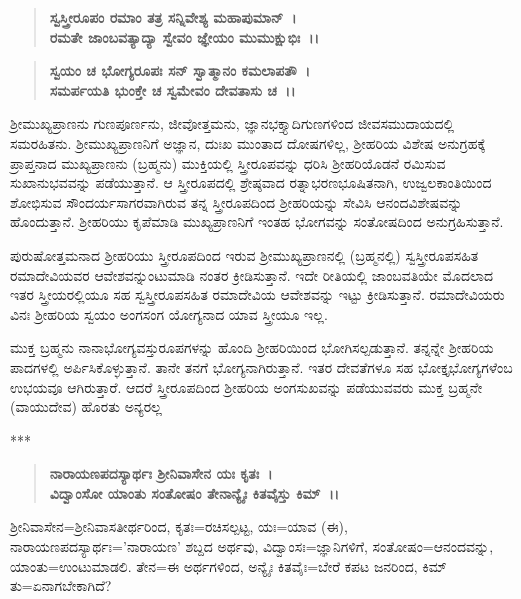 \begin{verse}
\textbf{ಸ್ವಸ್ತ್ರೀರೂಪಂ ರಮಾಂ ತತ್ರ ಸನ್ನಿವೇಶ್ಯ ಮಹಾಪುಮಾನ್~।}\\\textbf{ರಮತೇ ಜಾಂಬವತ್ಯಾದ್ಯಾ ಸ್ವೇವಂ ಜ್ಞೇಯಂ ಮುಮುಕ್ಷುಭಿಃ~।।}
\end{verse}

\begin{verse}
\textbf{ಸ್ವಯಂ ಚ ಭೋಗ್ಯರೂಪಃ ಸನ್ ಸ್ವಾತ್ಮಾನಂ ಕಮಲಾಪತೌ~।}\\\textbf{ಸಮರ್ಪಯತಿ ಭುಂಕ್ತೇ ಚ ಸ್ವಮೇವಂ ದೇವತಾಸು ಚ~।।}
\end{verse}


\vskip 3pt

ಶ‍್ರೀಮುಖ್ಯಪ್ರಾಣನು ಗುಣಪೂರ್ಣನು, ಜೀವೋತ್ತಮನು, ಜ್ಞಾನಭಕ್ತ್ಯಾದಿಗುಣಗಳಿಂದ ಜೀವಸಮುದಾಯದಲ್ಲಿ ಸಮರಹಿತನು. ಶ‍್ರೀಮುಖ್ಯಪ್ರಾಣನಿಗೆ ಅಜ್ಞಾನ, ದುಃಖ ಮುಂತಾದ ದೋಷಗಳಿಲ್ಲ, ಶ‍್ರೀಹರಿಯ ವಿಶೇಷ ಅನುಗ್ರಹಕ್ಕೆ ಪ್ರಾಪ್ತನಾದ ಮುಖ್ಯ\-ಪ್ರಾಣನು (ಬ್ರಹ್ಮನು) ಮುಕ್ತಿಯಲ್ಲಿ ಸ್ತ್ರೀರೂಪವನ್ನು ಧರಿಸಿ ಶ‍್ರೀಹರಿಯೊಡನೆ ರಮಿಸುವ ಸುಖಾನುಭವವನ್ನು ಪಡೆಯುತ್ತಾನೆ. ಆ ಸ್ತ್ರೀರೂಪದಲ್ಲಿ ಶ್ರೇಷ್ಠವಾದ ರತ್ನಾಭರಣಭೂಷಿತನಾಗಿ, ಉಜ್ವಲಕಾಂತಿಯಿಂದ ಶೋಭಿಸುವ ಸೌಂದರ್ಯಸಾಗರವಾಗಿರುವ ತನ್ನ ಸ್ತ್ರೀರೂಪದಿಂದ ಶ‍್ರೀಹರಿಯನ್ನು ಸೇವಿಸಿ ಆನಂದವಿಶೇಷವನ್ನು ಹೊಂದುತ್ತಾನೆ. ಶ‍್ರೀಹರಿಯು ಕೃಪೆಮಾಡಿ ಮುಖ್ಯಪ್ರಾಣನಿಗೆ ಇಂತಹ ಭೋಗವನ್ನು ಸಂತೋಷದಿಂದ ಅನುಗ್ರಹಿಸುತ್ತಾನೆ.

ಪುರುಷೋತ್ತಮನಾದ ಶ‍್ರೀಹರಿಯು ಸ್ತ್ರೀರೂಪದಿಂದ ಇರುವ ಶ‍್ರೀಮುಖ್ಯಪ್ರಾಣನಲ್ಲಿ (ಬ್ರಹ್ಮನಲ್ಲಿ) ಸ್ವಸ್ತ್ರೀರೂಪಸಹಿತ ರಮಾದೇವಿಯವರ ಆವೇಶವನ್ನುಂಟುಮಾಡಿ ನಂತರ ಕ್ರೀಡಿಸುತ್ತಾನೆ. ಇದೇ ರೀತಿಯಲ್ಲಿ ಜಾಂಬವತಿಯೇ ಮೊದಲಾದ ಇತರ ಸ್ತ್ರೀಯರಲ್ಲಿಯೂ ಸಹ ಸ್ವಸ್ತ್ರೀರೂಪಸಹಿತ ರಮಾದೇವಿಯ ಆವೇಶವನ್ನು ಇಟ್ಟು ಕ್ರೀಡಿಸುತ್ತಾನೆ. ರಮಾದೇವಿಯರು ವಿನಃ ಶ‍್ರೀಹರಿಯ ಸ್ವಯಂ ಅಂಗಸಂಗ ಯೋಗ್ಯನಾದ ಯಾವ ಸ್ತ್ರೀಯೂ ಇಲ್ಲ.

ಮುಕ್ತ ಬ್ರಹ್ಮನು ನಾನಾಭೋಗ್ಯವಸ್ತುರೂಪಗಳನ್ನು ಹೊಂದಿ ಶ‍್ರೀಹರಿಯಿಂದ ಭೋಗಿಸಲ್ಪ\-ಡುತ್ತಾನೆ. ತನ್ನನ್ನೇ ಶ‍್ರೀಹರಿಯ ಪಾದಗಳಲ್ಲಿ ಅರ್ಪಿಸಿಕೊಳ್ಳುತ್ತಾನೆ. ತಾನೇ ತನಗೆ ಭೋಗ್ಯನಾಗಿರುತ್ತಾನೆ. ಇತರ ದೇವತೆಗಳೂ ಸಹ ಭೋಕ್ತೃಭೋಗ್ಯಗಳೆಂಬ ಉಭಯವೂ ಆಗಿರುತ್ತಾರೆ. ಆದರೆ ಸ್ತ್ರೀರೂಪದಿಂದ ಶ‍್ರೀಹರಿಯ ಅಂಗಸುಖವನ್ನು ಪಡೆಯುವವರು ಮುಕ್ತ ಬ್ರಹ್ಮನೇ (ವಾಯುದೇವ) ಹೊರತು ಅನ್ಯರಲ್ಲ

\begin{center}
***
\end{center}

\begin{verse}
\textbf{ನಾರಾಯಣಪದಸ್ಯಾರ್ಥಃ ಶ‍್ರೀನಿವಾಸೇನ ಯಃ ಕೃತಃ~।}\\\textbf{ವಿದ್ವಾಂಸೋ ಯಾಂತು ಸಂತೋಷಂ ತೇನಾನ್ಯೈಃ ಕಿತವೈಸ್ತು ಕಿಮ್~।।}
\end{verse}

\vskip 3pt

ಶ‍್ರೀನಿವಾಸೇನ=ಶ‍್ರೀನಿವಾಸತೀರ್ಥರಿಂದ, ಕೃತಃ=ರಚಿಸಲ್ಪಟ್ಟ, ಯಃ=ಯಾವ (ಈ), ನಾರಾಯಣಪದಸ್ಯಾರ್ಥಃ='ನಾರಾಯಣ' ಶಬ್ದದ ಅರ್ಥವು, ವಿದ್ವಾಂಸಃ=ಜ್ಞಾನಿಗಳಿಗೆ, ಸಂತೋಷಂ=\-ಆನಂದವನ್ನು, ಯಾಂತು=ಉಂಟುಮಾಡಲಿ. ತೇನ=ಈ ಅರ್ಥಗಳಿಂದ, ಅನ್ಯೈಃ ಕಿತವೈಃ=ಬೇರೆ ಕಪಟ ಜನರಿಂದ, ಕಿಮ್ ತು=ಏನಾಗಬೇಕಾಗಿದೆ?

